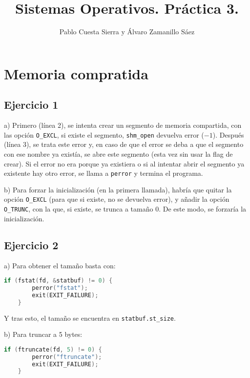 \documentclass{article}
\begin{document}
\title{Sistemas Operativos. Práctica 3.}
\author{Pablo Cuesta Sierra y Álvaro Zamanillo Sáez}
\date{}
\maketitle

\begin{tcolorbox}
\tableofcontents
\end{tcolorbox}

\section*{Memoria compratida}

\subsection*{Ejercicio 1}

a) Primero (línea 2), se intenta crear un segmento de memoria compartida, con las opción \texttt{O\_EXCL}, si existe el segmento, \texttt{shm\_open} devuelva error ($-1$). Después (línea 3), se trata este error y, en caso de que el error se deba a que el segmento con ese nombre ya existía, se abre este segmento (esta vez sin usar la flag de crear). Si el error no era porque ya existiera o si al intentar abrir el segmento ya existente hay otro error, se llama a \texttt{perror} y termina el programa. 

b) Para forzar la inicialización (en la primera llamada), habría que quitar la opción \texttt{O\_EXCL} (para que si existe, no se devuelva error), y añadir la opción \texttt{O\_TRUNC}, con la que, si existe, se trunca a tamaño 0. De este modo, se forzaría la inicialización. 


\subsection*{Ejercicio 2}

a) Para obtener el tamaño basta con:

\begin{lstlisting}[language=C]
    if (fstat(fd, &statbuf) != 0) {
        perror("fstat");
        exit(EXIT_FAILURE);
    } 
\end{lstlisting} 
Y tras esto, el tamaño se encuentra en \texttt{statbuf.st\_size}.

b) Para truncar a 5 bytes:
\begin{lstlisting}[language=C]
    if (ftruncate(fd, 5) != 0) {
        perror("ftruncate");
        exit(EXIT_FAILURE);
    }
\end{lstlisting}
 
\end{document}
